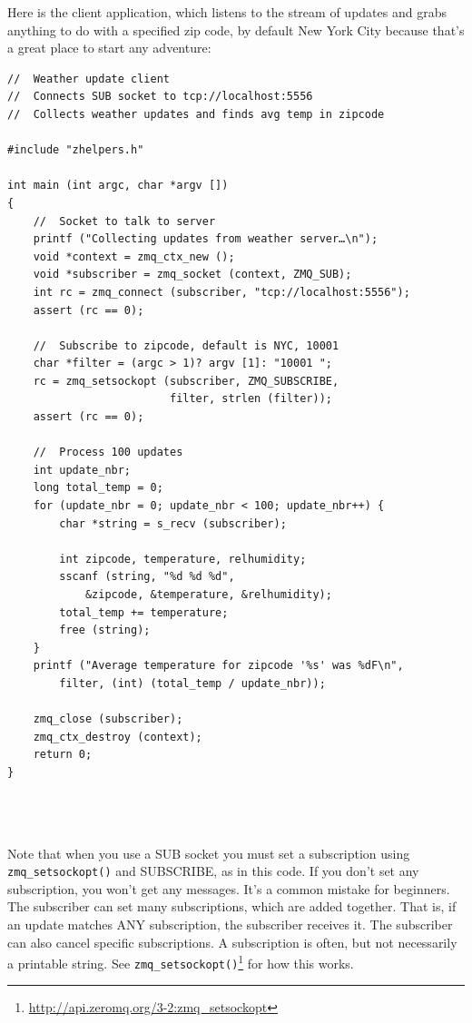 Here is the client application, which listens to the stream of updates and
grabs anything to do with a specified zip code, by default New York City
because that's a great place to start any adventure:
\begin{verbatim}
//  Weather update client
//  Connects SUB socket to tcp://localhost:5556
//  Collects weather updates and finds avg temp in zipcode

#include "zhelpers.h"

int main (int argc, char *argv [])
{
    //  Socket to talk to server
    printf ("Collecting updates from weather server…\n");
    void *context = zmq_ctx_new ();
    void *subscriber = zmq_socket (context, ZMQ_SUB);
    int rc = zmq_connect (subscriber, "tcp://localhost:5556");
    assert (rc == 0);

    //  Subscribe to zipcode, default is NYC, 10001
    char *filter = (argc > 1)? argv [1]: "10001 ";
    rc = zmq_setsockopt (subscriber, ZMQ_SUBSCRIBE,
                         filter, strlen (filter));
    assert (rc == 0);

    //  Process 100 updates
    int update_nbr;
    long total_temp = 0;
    for (update_nbr = 0; update_nbr < 100; update_nbr++) {
        char *string = s_recv (subscriber);

        int zipcode, temperature, relhumidity;
        sscanf (string, "%d %d %d",
            &zipcode, &temperature, &relhumidity);
        total_temp += temperature;
        free (string);
    }
    printf ("Average temperature for zipcode '%s' was %dF\n",
        filter, (int) (total_temp / update_nbr));

    zmq_close (subscriber);
    zmq_ctx_destroy (context);
    return 0;
}
\end{verbatim}
\inputminted[baselinestretch=0.8,stripnl=false]{scheme}{../tests/publish-subscribe/client.scm}
\inputminted[baselinestretch=0.8,stripnl=false]{scheme}{../tests/publish-subscribe/client-sugar.scm}

\inputminted[baselinestretch=0.8,stripnl=false]{scheme}{../tests/publish-subscribe/pub-sub-system-components.scm}
\inputminted[baselinestretch=0.8,stripnl=false]{scheme}{../tests/publish-subscribe/pub-sub-system.scm}

Note that when you use a SUB socket you must set a subscription using
\Verb|zmq_setsockopt()| and SUBSCRIBE, as in this code. If you don't set any
subscription, you won't get any messages. It's a common mistake for beginners.
The subscriber can set many subscriptions, which are added together. That is,
if an update matches ANY subscription, the subscriber receives it. The
    subscriber can also cancel specific subscriptions. A subscription is often,
    but not necessarily a printable string. See
    \Verb|zmq_setsockopt()|\footnote{\url{http://api.zeromq.org/3-2:zmq\_setsockopt}}
    for how this works.




